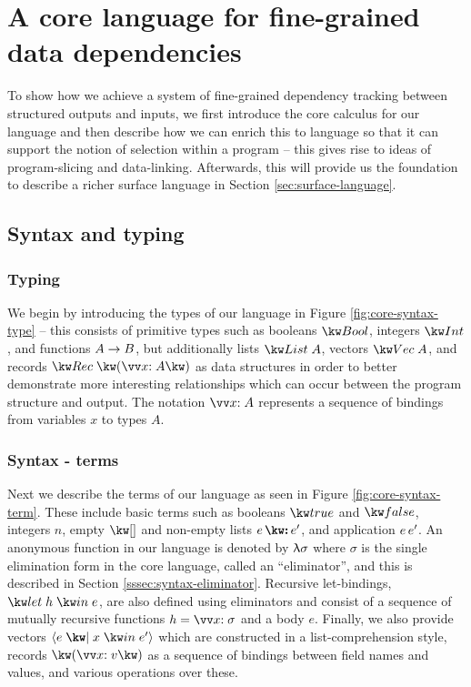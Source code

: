 \newpage

\section{A core language for fine-grained data dependencies}
\label{sec:core-language}

To show how we achieve a system of fine-grained dependency tracking between structured outputs and inputs, we first introduce the core calculus for our language and then describe how we can enrich this to language so that it can support the notion of selection within a program -- this gives rise to ideas of program-slicing and data-linking. Afterwards, this will provide us the foundation to describe a richer surface language in Section \ref{sec:surface-language}.

\subsection{Syntax and typing}

\subsubsection{Typing}
We begin by introducing the types of our language in Figure \ref{fig:core-syntax-type} -- this consists of primitive types such as booleans $\tyBool$, integers $\tyInt$, and functions ${A}\rightarrow{B}$, but additionally lists $\tyList{A}$, vectors $\tyVec{A}$, and records $\tyRec{\vec{\bind{x}{A}}}$ as data structures in order to better demonstrate more interesting relationships which can occur between the program structure and output. The notation $\seq{\bind{x}{A}}$  represents a sequence of bindings from variables $x$ to types $A$.



\subsubsection{Syntax - terms}
Next we describe the terms of our language as seen in Figure \ref{fig:core-syntax-term}.  These include basic terms such as booleans $\exTrue$ and $\exFalse$, integers $n$, empty $\exNil$ and non-empty lists $\exCons{e}{e'}$, and application ${e}\,{e'}$. An anonymous function in our language is denoted by $\uplambda{\sigma}$ where $\sigma$ is the single elimination form in the core language, called an ``eliminator'', and this is described in Section \ref{sssec:syntax-eliminator}. Recursive let-bindings, $\exLetRecMutual{h}{e}$, are also defined using eliminators and consist of a sequence of mutually recursive functions $h = \seq{\bind{x}{\sigma}}$ and a body $e$. Finally, we also provide vectors $\exVec{e}{x}{e'}$ which are constructed in a list-comprehension style, records $\exRec{\vec{\bind{x}{v}}}$ as a sequence of bindings between field names and values, and various operations over these. 


